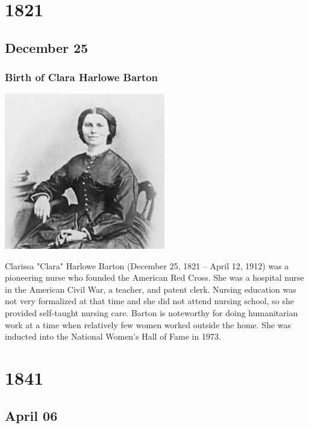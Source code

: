 \documentclass[11pt]{report}
\begin{document}
\chapter{1821}
\section{December 25}
\subsection{Birth of Clara Harlowe Barton}
\vspace{2mm}\begin{center}\includegraphics[width=7cm]{./img/claraBarton.jpg}\end{center}
Clarissa "Clara" Harlowe Barton (December 25, 1821 – April 12, 1912) was a pioneering nurse who founded the American Red Cross. She was a hospital nurse in the American Civil War, a teacher, and patent clerk. Nursing education was not very formalized at that time and she did not attend nursing school, so she provided self-taught nursing care. Barton is noteworthy for doing humanitarian work at a time when relatively few women worked outside the home. She was inducted into the National Women's Hall of Fame in 1973.

\chapter{1841}
\section{April 06}
\end{document}

